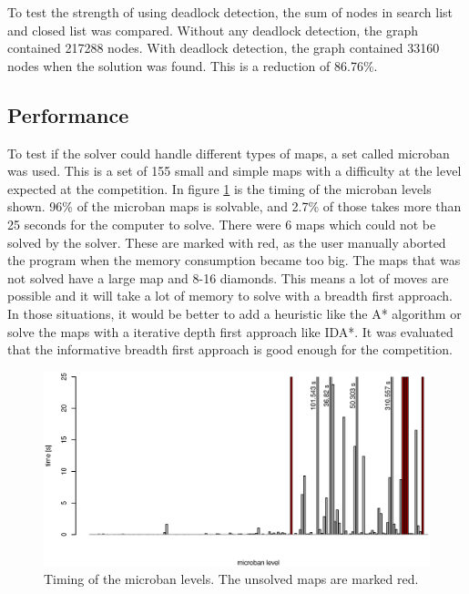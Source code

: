 To test the strength of using deadlock detection, the sum of nodes in search list and closed list was compared.
Without any deadlock detection, the graph contained 217288 nodes.
With deadlock detection, the graph contained 33160 nodes when the solution was found.
This is a reduction of 86.76\%. 

\subsection{Performance}
To test if the solver could handle different types of maps, a set called microban \cite{url:microban} was used.
This is a set of 155 small and simple maps with a difficulty at the level expected at the competition.
In figure \ref{fig:microban_timing} is the timing of the microban levels shown.
96\% of the microban maps is solvable, and 2.7\% of those takes more than 25 seconds for the computer to solve.
There were 6 maps which could not be solved by the solver. These are marked with red, as the user manually aborted the program when the memory consumption became too big.
The maps that was not solved have a large map and 8-16 diamonds. 
This means a lot of moves are possible and it will take a lot of memory to solve with a breadth first approach.
In those situations, it would be better to add a heuristic like the A* algorithm or solve the maps with a iterative depth first approach like IDA*.
It was evaluated that the informative breadth first approach is good enough for the competition.

\begin{figure}[h]
 \centering
 \includegraphics[width=\textwidth]{img/micoban_timing.eps}
 \caption{Timing of the microban levels. The unsolved maps are marked red.}
 \label{fig:microban_timing}
\end{figure}
